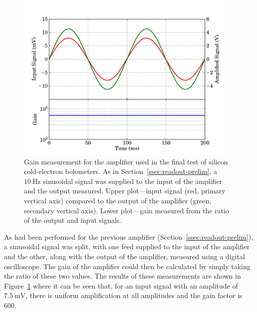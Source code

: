 \begin{figure}[t]
\begin{center}
\includegraphics[width = 0.95\textwidth]{figures/final_amp_gain}
\caption[Gain measurement of final amplifier]{Gain measurement for the amplifier used in the final test of silicon cold-electron bolometers. As in Section~\ref{ssec:readout-prelim}, a $10~\mathrm{Hz}$ sinusoidal signal was supplied to the input of the amplifier and the output measured. Upper plot---input signal (red, primary vertical axis) compared to the output of the amplifier (green, secondary vertical axis). Lower plot---gain measured from the ratio of the output and input signals.}
\label{fig:finalAmp_gain}
\end{center}
\end{figure}
\par 
As had been performed for the previous amplifier (Section~\ref{ssec:readout-prelim}), a sinusoidal signal was split, with one feed supplied to the input of the amplifier and the other, along with the output of the amplifier, measured using a digital oscilloscope. The gain of the amplifier could then be calculated by simply taking the ratio of these two values. The results of these measurements are shown in Figure~\ref{fig:finalAmp_gain} where it can be seen that, for an input signal with an amplitude of $7.5~\mathrm{mV}$, there is uniform amplification at all amplitudes and the gain factor is 600.
